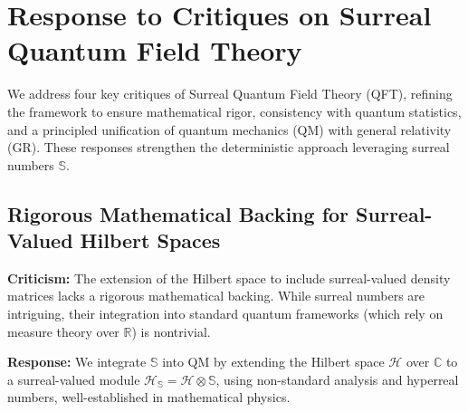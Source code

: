 \documentclass{article}
\begin{document}
\section{Response to Critiques on Surreal Quantum Field Theory}

We address four key critiques of Surreal Quantum Field Theory (QFT), refining the framework to ensure mathematical rigor, consistency with quantum statistics, and a principled unification of quantum mechanics (QM) with general relativity (GR). These responses strengthen the deterministic approach leveraging surreal numbers \(\mathbb{S}\).

\subsection{Rigorous Mathematical Backing for Surreal-Valued Hilbert Spaces}
\textbf{Criticism:} The extension of the Hilbert space to include surreal-valued density matrices lacks a rigorous mathematical backing. While surreal numbers are intriguing, their integration into standard quantum frameworks (which rely on measure theory over \(\mathbb{R}\)) is nontrivial.

\textbf{Response:}  
We integrate \(\mathbb{S}\) into QM by extending the Hilbert space \(\mathcal{H}\) over \(\mathbb{C}\) to a surreal-valued module \(\mathcal{H}_\mathbb{S} = \mathcal{H} \otimes \mathbb{S}\), using non-standard analysis and hyperreal numbers, well-established in mathematical physics.
\end{document}
